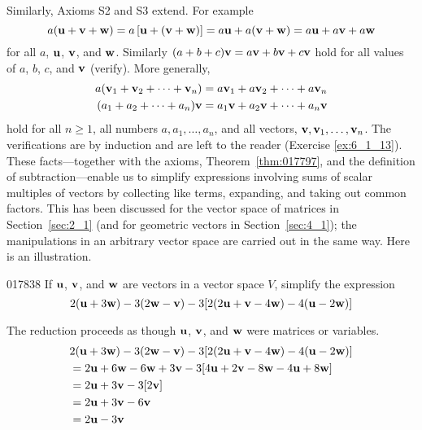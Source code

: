 Similarly, Axioms S2 and S3 extend. For example 
\begin{equation*}
a(\textbf{u} + \textbf{v} + \textbf{w}) = a\left[ \textbf{u} + (\textbf{v}+\textbf{w})\right] = a\textbf{u} + a(\textbf{v}+\textbf{w})=a\textbf{u} + a\textbf{v} + a\textbf{w}
\end{equation*}
for all $a$, $\textbf{u}$, $\textbf{v}$, and $\textbf{w}$. Similarly $(a + b + c)\textbf{v} = a\textbf{v} + b\textbf{v} + c\textbf{v}$ hold for all values of $a$, $b$, $c$, and $\textbf{v}$ (verify). More generally,
\begin{align*}
a(\textbf{v}_1 + \textbf{v}_2 + \dots + \textbf{v}_n) &= a\textbf{v}_1 + a\textbf{v}_2 + \dots + a\textbf{v}_n \\
(a_1 + a_2 + \dots + a_n)\textbf{v} &= a_1\textbf{v} + a_2\textbf{v} + \dots + a_n\textbf{v}
\end{align*}
hold for all $n \geq 1$, all numbers $a, a_{1}, \dots, a_{n}$, and all vectors, $\textbf{v}, \textbf{v}_{1}, \dots, \textbf{v}_{n}$. The verifications are by induction and are left to the reader (Exercise \ref{ex:6_1_13}). These facts---together with the axioms, Theorem~\ref{thm:017797}, and the definition of subtraction---enable us to simplify expressions involving sums of scalar multiples of vectors by collecting like terms, expanding, and taking out common factors. This has been discussed for the vector space of matrices in Section~\ref{sec:2_1} (and for geometric vectors in Section~\ref{sec:4_1}); the manipulations in an arbitrary vector space are carried out in the same way. Here is an illustration.

\begin{example}{}{017838}
If $\textbf{u}$, $\textbf{v}$, and $\textbf{w}$ are vectors in a vector space $V$, simplify the expression
\begin{equation*}
2(\textbf{u} + 3 \textbf{w}) - 3(2\textbf{w} - \textbf{v}) - 3[2(2\textbf{u} + \textbf{v} - 4\textbf{w}) - 4(\textbf{u} - 2\textbf{w})]
\end{equation*}
\begin{solution}
The reduction proceeds as though $\textbf{u}$, $\textbf{v}$, and $\textbf{w}$ were matrices or variables.
\begin{align*}
& 2(\textbf{u} + 3 \textbf{w}) - 3(2\textbf{w} - \textbf{v}) - 3[2(2\textbf{u} + \textbf{v} - 4\textbf{w}) - 4(\textbf{u} - 2\textbf{w})] \\
&= 2\textbf{u} + 6\textbf{w} - 6\textbf{w} + 3\textbf{v} - 3[4\textbf{u} + 2\textbf{v} - 8\textbf{w} - 4\textbf{u} + 8\textbf{w}]  \\
&= 2\textbf{u} + 3\textbf{v} - 3[2\textbf{v}] \\
&= 2\textbf{u} + 3\textbf{v} - 6\textbf{v} \\
&= 2\textbf{u} - 3\textbf{v}
\end{align*}
\end{solution}
\end{example}

